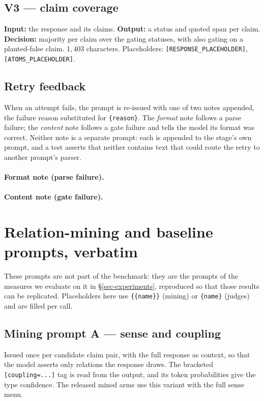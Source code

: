 \subsection{V3 --- claim coverage}
\label{app-v3}
\textbf{Input:} the response and its claims. \textbf{Output:} a status and quoted span per claim. \textbf{Decision:}
majority per claim over the gating statuses, with  also gating on a planted-false claim. $1{,}403$ characters. Placeholders: \verb|[RESPONSE_PLACEHOLDER]|,
\verb|[ATOMS_PLACEHOLDER]|.

\subsection{Retry feedback}
\label{app-retry}
When an attempt fails, the prompt is re-issued with one of two notes appended, the failure reason substituted for
\verb|{reason}|. The \emph{format} note follows a parse failure; the \emph{content} note follows a gate failure and tells
the model its format was correct. Neither note is a separate prompt: each is appended to the stage's own prompt, and a
test asserts that neither contains text that could route the retry to another prompt's parser.

\paragraph{Format note (parse failure).}

\paragraph{Content note (gate failure).}

\section{Relation-mining and baseline prompts, verbatim}
\label{app-mining}

These prompts are not part of the benchmark: they are the prompts of the measures we evaluate on it in
\S\ref{sec-experiments}, reproduced so that those results can be replicated. Placeholders here use
\verb|{{name}}| (mining) or \verb|{name}| (judges) and are filled per call.

\subsection{Mining prompt A --- sense and coupling}
Issued once per candidate claim pair, with the full response as context, so that the model asserts only relations the
response draws. The bracketed \verb|[coupling=...]| tag is read from the output, and its token probabilities give the
type confidence. The released mined arms use this variant with the full sense menu.

